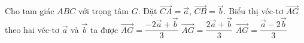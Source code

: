 \begin{ex}%
	Cho tam giác $ABC$ với trọng tâm $G$. Đặt $\overrightarrow{CA} =\overrightarrow{a}$, $\overrightarrow{CB}=\overrightarrow{b}$. Biểu thị véc-tơ $\overrightarrow{AG}$ theo hai véc-tơ $\overrightarrow{a}$ và $\overrightarrow{b}$ ta được
	{\True $\overrightarrow{AG}= \dfrac{-2\overrightarrow{a}+\overrightarrow{b}}{3}$}
	{$\overrightarrow{AG}= \dfrac{2\overrightarrow{a} +\overrightarrow{b}}{3}$}
	{$\overrightarrow{AG}= \dfrac{\overrightarrow{a} -2\overrightarrow{b}}{3}$}
\end{ex}
